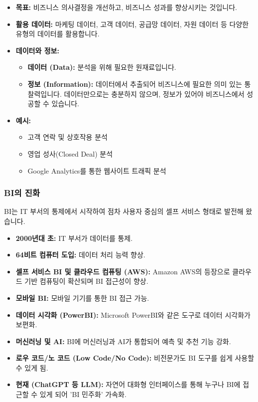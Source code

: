 \documentclass[11pt,a4paper]{article}
\begin{document}
\begin{itemize}
    \item \textbf{목표:} 비즈니스 의사결정을 개선하고, 비즈니스 성과를 향상시키는 것입니다.
    \item \textbf{활용 데이터:} 마케팅 데이터, 고객 데이터, 공급망 데이터, 자원 데이터 등 다양한 유형의 데이터를 활용합니다.
    \item \textbf{데이터와 정보:}
    \begin{itemize}
        \item \textbf{데이터 (Data):} 분석을 위해 필요한 원재료입니다.
        \item \textbf{정보 (Information):} 데이터에서 추출되어 비즈니스에 필요한 의미 있는 통찰력입니다. 데이터만으로는 충분하지 않으며, 정보가 있어야 비즈니스에서 성공할 수 있습니다.
    \end{itemize}
    \item \textbf{예시:}
    \begin{itemize}
        \item 고객 연락 및 상호작용 분석
        \item 영업 성사(Closed Deal) 분석
        \item Google Analytics를 통한 웹사이트 트래픽 분석
    \end{itemize}
\end{itemize}

\subsubsection{BI의 진화}
BI는 IT 부서의 통제에서 시작하여 점차 사용자 중심의 셀프 서비스 형태로 발전해 왔습니다.

\begin{itemize}
    \item \textbf{2000년대 초:} IT 부서가 데이터를 통제.
    \item \textbf{64비트 컴퓨터 도입:} 데이터 처리 능력 향상.
    \item \textbf{셀프 서비스 BI 및 클라우드 컴퓨팅 (AWS):} Amazon AWS의 등장으로 클라우드 기반 컴퓨팅이 확산되며 BI 접근성이 향상.
    \item \textbf{모바일 BI:} 모바일 기기를 통한 BI 접근 가능.
    \item \textbf{데이터 시각화 (PowerBI):} Microsoft PowerBI와 같은 도구로 데이터 시각화가 보편화.
    \item \textbf{머신러닝 및 AI:} BI에 머신러닝과 AI가 통합되어 예측 및 추천 기능 강화.
    \item \textbf{로우 코드/노 코드 (Low Code/No Code):} 비전문가도 BI 도구를 쉽게 사용할 수 있게 됨.
    \item \textbf{현재 (ChatGPT 등 LLM):} 자연어 대화형 인터페이스를 통해 누구나 BI에 접근할 수 있게 되어 'BI 민주화' 가속화.
\end{itemize}
\end{document}
